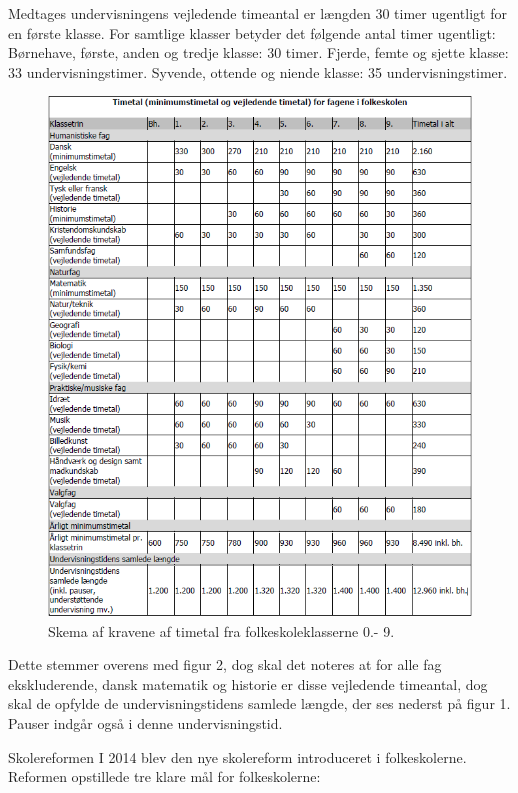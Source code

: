Medtages undervisningens vejledende timeantal er længden 30 timer ugentligt for en første klasse. For samtlige klasser betyder det følgende antal timer ugentligt:
Børnehave, første, anden og tredje klasse: 30 timer.
Fjerde, femte og sjette klasse: 33 undervisningstimer.
Syvende, ottende og niende klasse: 35 undervisningstimer.

\begin{figure}[!ht]
  \centering
  \includegraphics[width=\textwidth]{partials/graphics/overallskemaovertimetal.png}
  \caption{Skema af kravene af timetal fra folkeskoleklasserne 0.- 9.}
  \label{fig:Timetal}
\end{figure}

Dette stemmer overens med figur 2, dog skal det noteres at for alle fag ekskluderende, dansk matematik og historie  er disse vejledende timeantal, dog skal de opfylde de undervisningstidens samlede længde, der ses nederst på figur 1. Pauser indgår også i denne undervisningstid.
 	
Skolereformen
I 2014 blev den nye skolereform introduceret i folkeskolerne. Reformen opstillede tre klare mål for folkeskolerne:

